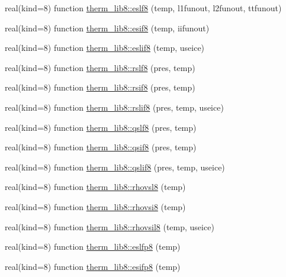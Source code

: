 \begin{DoxyCompactItemize}
\item 
real(kind=8) function \hyperlink{namespacetherm__lib8_aa7a527bdf772238306801f7f86e6db58}{therm\+\_\+lib8\+::eslf8} (temp, l1funout, l2funout, ttfunout)
\item 
real(kind=8) function \hyperlink{namespacetherm__lib8_a4c2e61543813926681cd581b4c72f0a9}{therm\+\_\+lib8\+::esif8} (temp, iifunout)
\item 
real(kind=8) function \hyperlink{namespacetherm__lib8_a1b4385a0130e311cf955294b6ae00f7a}{therm\+\_\+lib8\+::eslif8} (temp, useice)
\item 
real(kind=8) function \hyperlink{namespacetherm__lib8_ae2428f5fab9f3796e437eee297f7972b}{therm\+\_\+lib8\+::rslf8} (pres, temp)
\item 
real(kind=8) function \hyperlink{namespacetherm__lib8_a07814f1748b78bb1eb6f7cf12c6e2244}{therm\+\_\+lib8\+::rsif8} (pres, temp)
\item 
real(kind=8) function \hyperlink{namespacetherm__lib8_a0f62e29f88493f7bc240060f337ade98}{therm\+\_\+lib8\+::rslif8} (pres, temp, useice)
\item 
real(kind=8) function \hyperlink{namespacetherm__lib8_a91c0c02e09a53dfba149bcb4b83d13f6}{therm\+\_\+lib8\+::qslf8} (pres, temp)
\item 
real(kind=8) function \hyperlink{namespacetherm__lib8_a7b40fbdb54ace8154fe028b1c730dd72}{therm\+\_\+lib8\+::qsif8} (pres, temp)
\item 
real(kind=8) function \hyperlink{namespacetherm__lib8_aa9d6ede67f0021ccc80049f582b3177b}{therm\+\_\+lib8\+::qslif8} (pres, temp, useice)
\item 
real(kind=8) function \hyperlink{namespacetherm__lib8_a7637ae750048c15021f04db2db524ed9}{therm\+\_\+lib8\+::rhovsl8} (temp)
\item 
real(kind=8) function \hyperlink{namespacetherm__lib8_ab68e2d396a76f6b21291816fcfcc73a2}{therm\+\_\+lib8\+::rhovsi8} (temp)
\item 
real(kind=8) function \hyperlink{namespacetherm__lib8_ac356df009ed9ba07965dde7292121e0c}{therm\+\_\+lib8\+::rhovsil8} (temp, useice)
\item 
real(kind=8) function \hyperlink{namespacetherm__lib8_a3f44aca95e1fb010823bb94ede3d19ca}{therm\+\_\+lib8\+::eslfp8} (temp)
\item 
real(kind=8) function \hyperlink{namespacetherm__lib8_a73a640719683dd2b05aba5a87822aa22}{therm\+\_\+lib8\+::esifp8} (temp)
\item 

\end{DoxyCompactItemize}
